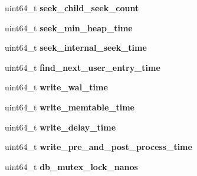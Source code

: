 \begin{DoxyCompactItemize}
\item 
uint64\+\_\+t {\bfseries seek\+\_\+child\+\_\+seek\+\_\+count}\hypertarget{structrocksdb_1_1PerfContext_ad7740027368daaeb0fb9aead7da8fda4}{}\label{structrocksdb_1_1PerfContext_ad7740027368daaeb0fb9aead7da8fda4}

\item 
uint64\+\_\+t {\bfseries seek\+\_\+min\+\_\+heap\+\_\+time}\hypertarget{structrocksdb_1_1PerfContext_a6b9307813ea5cb2c7b113004ef71fd9e}{}\label{structrocksdb_1_1PerfContext_a6b9307813ea5cb2c7b113004ef71fd9e}

\item 
uint64\+\_\+t {\bfseries seek\+\_\+internal\+\_\+seek\+\_\+time}\hypertarget{structrocksdb_1_1PerfContext_a12783c96b370ceadf215c51765f792d1}{}\label{structrocksdb_1_1PerfContext_a12783c96b370ceadf215c51765f792d1}

\item 
uint64\+\_\+t {\bfseries find\+\_\+next\+\_\+user\+\_\+entry\+\_\+time}\hypertarget{structrocksdb_1_1PerfContext_a04a41f137d51d069f63918278010fc17}{}\label{structrocksdb_1_1PerfContext_a04a41f137d51d069f63918278010fc17}

\item 
uint64\+\_\+t {\bfseries write\+\_\+wal\+\_\+time}\hypertarget{structrocksdb_1_1PerfContext_a642c74d50a90f89fcf602ae03701dc17}{}\label{structrocksdb_1_1PerfContext_a642c74d50a90f89fcf602ae03701dc17}

\item 
uint64\+\_\+t {\bfseries write\+\_\+memtable\+\_\+time}\hypertarget{structrocksdb_1_1PerfContext_a6a8fbf490591369c99dd8b2007cc5c56}{}\label{structrocksdb_1_1PerfContext_a6a8fbf490591369c99dd8b2007cc5c56}

\item 
uint64\+\_\+t {\bfseries write\+\_\+delay\+\_\+time}\hypertarget{structrocksdb_1_1PerfContext_a0b4ec7be0221811768938460590c352c}{}\label{structrocksdb_1_1PerfContext_a0b4ec7be0221811768938460590c352c}

\item 
uint64\+\_\+t {\bfseries write\+\_\+pre\+\_\+and\+\_\+post\+\_\+process\+\_\+time}\hypertarget{structrocksdb_1_1PerfContext_a7ab63f68d710cbf8c8667e6e42d8c6f2}{}\label{structrocksdb_1_1PerfContext_a7ab63f68d710cbf8c8667e6e42d8c6f2}

\item 
uint64\+\_\+t {\bfseries db\+\_\+mutex\+\_\+lock\+\_\+nanos}\hypertarget{structrocksdb_1_1PerfContext_afbc9e4025fe20328a649b4021fd6be9a}{}\label{structrocksdb_1_1PerfContext_afbc9e4025fe20328a649b4021fd6be9a}


\end{DoxyCompactItemize}
